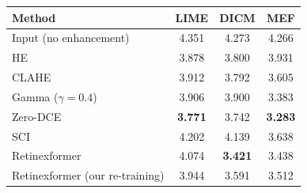 \begin{tabular}{l ccc}
\toprule
Method & LIME & DICM & MEF \\
\midrule
Input (no enhancement) & 4.351 & 4.273 & 4.266 \\
HE & 3.878 & 3.800 & 3.931 \\
CLAHE & 3.912 & 3.792 & 3.605 \\
Gamma ($\gamma{=}0.4$) & 3.906 & 3.900 & 3.383 \\
Zero-DCE~\cite{guo2020zerodce} & \textbf{3.771} & 3.742 & \textbf{3.283} \\
SCI~\cite{ma2022sci} & 4.202 & 4.139 & 3.638 \\
Retinexformer~\cite{cai2023retinexformer} & 4.074 & \textbf{3.421} & 3.438 \\
Retinexformer (our re-training) & 3.944 & 3.591 & 3.512 \\
\bottomrule
\end{tabular}
